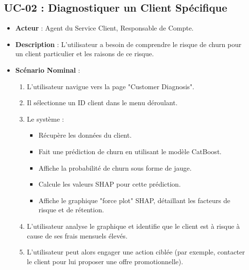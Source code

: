 \subsection{UC-02 : Diagnostiquer un Client Spécifique}
\begin{itemize}
    \item \textbf{Acteur} : Agent du Service Client, Responsable de Compte.
    \item \textbf{Description} : L'utilisateur a besoin de comprendre le risque de churn pour un client particulier et les raisons de ce risque.
    \item \textbf{Scénario Nominal} :
    \begin{enumerate}
        \item L'utilisateur navigue vers la page "Customer Diagnosis".
        \item Il sélectionne un ID client dans le menu déroulant.
        \item Le système :
        \begin{itemize}
            \item Récupère les données du client.
            \item Fait une prédiction de churn en utilisant le modèle CatBoost.
            \item Affiche la probabilité de churn sous forme de jauge.
            \item Calcule les valeurs SHAP pour cette prédiction.
            \item Affiche le graphique "force plot" SHAP, détaillant les facteurs de risque et de rétention.
        \end{itemize}
        \item L'utilisateur analyse le graphique et identifie que le client est à risque à cause de ses frais mensuels élevés.
        \item L'utilisateur peut alors engager une action ciblée (par exemple, contacter le client pour lui proposer une offre promotionnelle).
    \end{enumerate}
\end{itemize}
